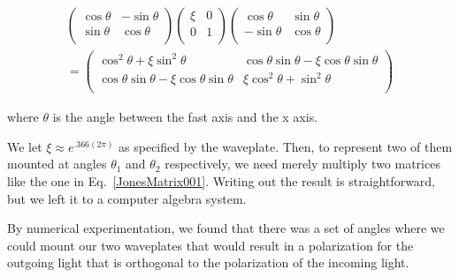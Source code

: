 \begin{multline}
\begin{pmatrix}
\cos\theta & - \sin \theta \\
\sin \theta & \cos\theta \\
\end{pmatrix}
\begin{pmatrix}
\xi & 0 \\
0 & 1 \\
\end{pmatrix}
\begin{pmatrix}
\cos\theta &  \sin \theta \\
-\sin \theta & \cos\theta \\
\end{pmatrix} \\
=
\begin{pmatrix}
\cos ^2 \theta+\xi \sin^2 \theta &  \cos\theta \sin \theta-\xi \cos\theta \sin \theta \\
\cos\theta \sin \theta-\xi \cos \theta \sin\theta & \xi \cos^2 \theta + \sin^2 \theta \\ \label{JonesMatrix001}
\end{pmatrix}
\end{multline}

where $\theta$ is the angle between the fast axis and the x axis. 

We let $\xi\approx e^{.366 (2 \pi)}$ as specified by the waveplate. Then, to represent two of them mounted at angles $\theta_1$ and $\theta_2$ respectively, we need merely multiply two matrices like the one in Eq.\ \ref{JonesMatrix001}. Writing out the result is straightforward, but we left it to a computer algebra system.

By numerical experimentation, we found that there was a set of angles where we could mount our two waveplates that would result in a polarization for the outgoing light that is orthogonal to the polarization of the incoming light. 

